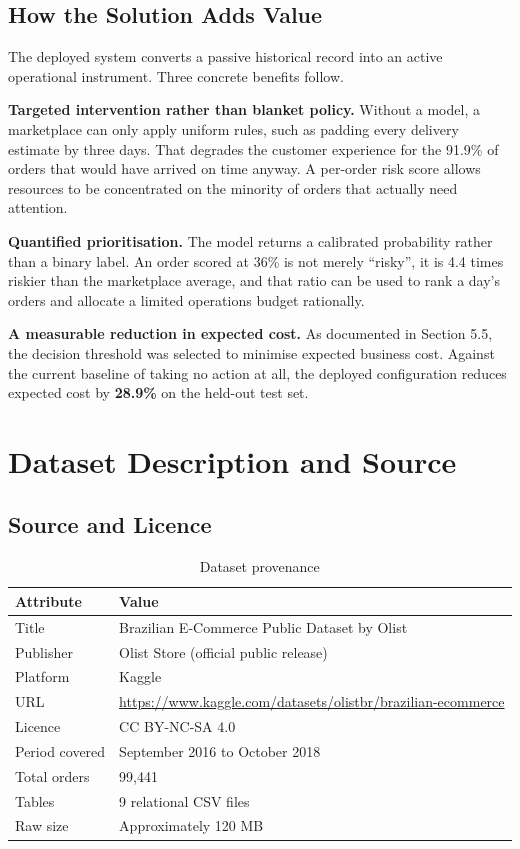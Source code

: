\documentclass[11pt,a4paper]{report}
\begin{document}
\section{How the Solution Adds Value}

The deployed system converts a passive historical record into an active
operational instrument. Three concrete benefits follow.

\textbf{Targeted intervention rather than blanket policy.} Without a model, a
marketplace can only apply uniform rules, such as padding every delivery estimate
by three days. That degrades the customer experience for the 91.9\% of orders
that would have arrived on time anyway. A per-order risk score allows resources
to be concentrated on the minority of orders that actually need attention.

\textbf{Quantified prioritisation.} The model returns a calibrated probability
rather than a binary label. An order scored at 36\% is not merely ``risky'', it
is 4.4 times riskier than the marketplace average, and that ratio can be used to
rank a day's orders and allocate a limited operations budget rationally.

\textbf{A measurable reduction in expected cost.} As documented in Section 5.5,
the decision threshold was selected to minimise expected business cost. Against
the current baseline of taking no action at all, the deployed configuration
reduces expected cost by \textbf{28.9\%} on the held-out test set.

\chapter{Dataset Description and Source}

\section{Source and Licence}

\begin{table}[H]
\centering
\caption{Dataset provenance}
\begin{tabular}{@{}ll@{}}
\toprule
\textbf{Attribute} & \textbf{Value} \\
\midrule
Title & Brazilian E-Commerce Public Dataset by Olist \\
Publisher & Olist Store (official public release) \\
Platform & Kaggle \\
URL & \url{https://www.kaggle.com/datasets/olistbr/brazilian-ecommerce} \\
Licence & CC BY-NC-SA 4.0 \\
Period covered & September 2016 to October 2018 \\
Total orders & 99{,}441 \\
Tables & 9 relational CSV files \\
Raw size & Approximately 120 MB \\
\bottomrule
\end{tabular}
\end{table}
\end{document}
